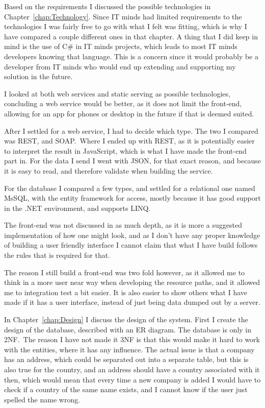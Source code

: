 Based on the requirements I discussed the possible technologies in
Chapter~\ref{chap:Technology}. Since IT minds had limited requirements to the
technologies I was fairly free to go with what I felt was fitting, which is why
I have compared a couple different ones in that chapter. A thing that I did keep
in mind is the use of C\# in IT minds projects, which leads to most IT minds
developers knowing that language. This is a concern since it would probably be
a developer from IT minds who would end up extending and supporting my solution
in the future.

I looked at both web services and static serving as possible technologies,
concluding a web service would be better, as it does not limit the front-end,
allowing for an app for phones or desktop in the future if that is deemed suited.

After I settled for a web service, I had to decide which type. The two I
compared was REST, and SOAP.\ Where I ended up with REST, as it is potentially
easier to interpret the result in JavaScript, which is what I have made the
front-end part in. For the data I send  I went with JSON, for that exact reason,
and because it is easy to read, and therefore validate when building the service.

For the database I compared a few types, and settled for a relational one named
MsSQL, with the entity framework for access, mostly because it has good support
in the .NET environment, and supports LINQ.\

The front-end was not discussed in as much depth, as it is more a suggested
implementation of how one might look, and as I don't have any proper knowledge
of building a user friendly interface I cannot claim that what I have build
follows the rules that is required for that. 

The reason I still build a front-end was two fold however, as it allowed me to
think in a more user near way when developing the resource paths, and it allowed
me to integration test a bit easier. It is also easier to show others what I
have made if it has a user interface, instead of just being data dumped out by a server.

In Chapter~\ref{chap:Design} I discuss the design of the system. First I create
the design of the database, described with an ER diagram. The database is only
in 2NF.\ The reason I have not made it 3NF is that this would make it hard to
work with the entities, where it has any influence. The actual issue is that a
company has an address, which could be separated out into a separate table, but
this is also true for the country, and an address should have a country
associated with it then, which would mean that every time a new company is added
I would have to check if a country of the same name exists, and I cannot know if
the user just spelled the name wrong.

